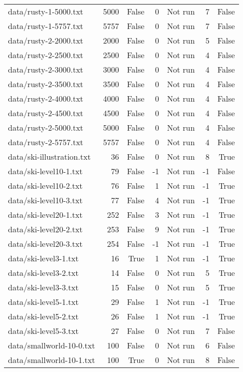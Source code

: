 \begin{tabular}{lrrrrrr}
data/rusty-1-5000.txt & 5000 & False & 0 & Not run & 7 & False \\
data/rusty-1-5757.txt & 5757 & False & 0 & Not run & 7 & False \\
data/rusty-2-2000.txt & 2000 & False & 0 & Not run & 5 & False \\
data/rusty-2-2500.txt & 2500 & False & 0 & Not run & 4 & False \\
data/rusty-2-3000.txt & 3000 & False & 0 & Not run & 4 & False \\
data/rusty-2-3500.txt & 3500 & False & 0 & Not run & 4 & False \\
data/rusty-2-4000.txt & 4000 & False & 0 & Not run & 4 & False \\
data/rusty-2-4500.txt & 4500 & False & 0 & Not run & 4 & False \\
data/rusty-2-5000.txt & 5000 & False & 0 & Not run & 4 & False \\
data/rusty-2-5757.txt & 5757 & False & 0 & Not run & 4 & False \\
data/ski-illustration.txt & 36 & False & 0 & Not run & 8 & True \\
data/ski-level10-1.txt & 79 & False & -1 & Not run & -1 & False \\
data/ski-level10-2.txt & 76 & False & 1 & Not run & -1 & True \\
data/ski-level10-3.txt & 77 & False & 4 & Not run & -1 & True \\
data/ski-level20-1.txt & 252 & False & 3 & Not run & -1 & True \\
data/ski-level20-2.txt & 253 & False & 9 & Not run & -1 & True \\
data/ski-level20-3.txt & 254 & False & -1 & Not run & -1 & True \\
data/ski-level3-1.txt & 16 & True & 1 & Not run & -1 & True \\
data/ski-level3-2.txt & 14 & False & 0 & Not run & 5 & True \\
data/ski-level3-3.txt & 15 & False & 0 & Not run & 5 & True \\
data/ski-level5-1.txt & 29 & False & 1 & Not run & -1 & True \\
data/ski-level5-2.txt & 26 & False & 1 & Not run & -1 & True \\
data/ski-level5-3.txt & 27 & False & 0 & Not run & 7 & False \\
data/smallworld-10-0.txt & 100 & False & 0 & Not run & 6 & False \\
data/smallworld-10-1.txt & 100 & True & 0 & Not run & 8 & False \\

\end{tabular}
